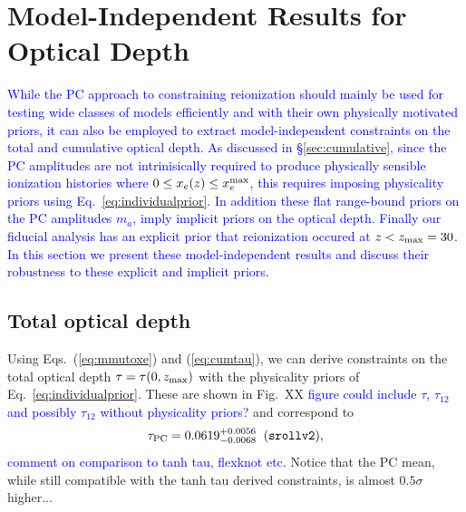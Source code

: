 \documentclass[prd,twocolumn,amsmath,amssymb,floatfix,superscriptaddress,nofootinbib]{revtex4-1}
\newcommand{\beq}{\begin{equation}}
\newcommand{\eeq}{\end{equation}}
\newcommand{\wh}[1]{\textcolor{blue}{#1}}
\begin{document}
\section{Model-Independent Results for Optical Depth}

\wh{
While the PC approach to constraining reionization should mainly be used for 
testing wide classes of models efficiently and with their own physically motivated priors, it can also be employed to extract model-independent constraints on the total and cumulative optical depth.  As discussed in \S \ref{sec:cumulative}, since the PC amplitudes are not intrinisically required
to produce physically sensible ionization histories where $0 \le x_e(z) \le x_e^{\rm max}$, this requires imposing physicality priors using Eq.~\ref{eq:individualprior}.  In addition these flat range-bound priors on the PC amplitudes $m_a$, imply implicit priors on the optical depth.   
Finally our fiducial analysis has an explicit prior that reionization occured
at $z<z_{\rm max}=30$.   In this section we present these model-independent results and discuss their robustness to these explicit and implicit priors.
}





\subsection{Total optical depth}
\label{sec:note_on_priors}


Using Eqs.~(\ref{eq:mmutoxe}) and (\ref{eq:cumtau}), we can derive constraints on the total optical
depth $\tau=\tau(0,z_{\rm max})$ with the physicality priors of Eq.~\ref{eq:individualprior}.  These are shown in Fig.~XX \wh{figure could include $\tau$, $\tau_{12}$ and possibly $\tau_{12}$ without physicality priors?} and correspond to
\beq
\tau_{\rm PC} = 0.0619^{+0.0056}_{-0.0068} \;\; (\texttt{srollv2}),
\label{eq:tau_pc_zmax30}
\eeq  
\wh{comment on comparison to tanh tau, flexknot etc.}
Notice that the PC mean, while still compatible with the tanh 
tau derived constraints, is almost $0.5\sigma$ higher...
\end{document}
